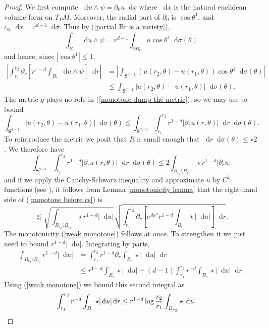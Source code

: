 \documentclass[reqno,10pt]{amsart}
\newcommand{\Sph}{\mathbf S}
\newcommand*\dif{\mathop{}\!\mathrm{d}}
\theoremstyle{definition}
\numberwithin{equation}{section}
\begin{document}
\begin{proof}
We first compute $\dif u \wedge \psi = \partial_0 u \dif x$
where $\dif x$ is the natural euclidean volume form on $T_PM$.
Moreover, the radial part of $\partial_0$ is $\cos \theta^1$, and $\iota_{\partial_r} \dif x = r^{d - 1} \dif \sigma$.
Thus by (\ref{partial Br is a variety}),
$$\int_{B_r} \dif u \wedge \psi = r^{d - 1}\int_{\partial B_r} u \cos \theta^1 \dif \sigma(\theta)$$
and hence, since $|\cos \theta^1| \leq 1$,
\begin{align}
\left|\int_{r_1}^{r_2} \partial_r \left[r^{1 - d}\int_{B_r} \dif u \wedge \psi\right] \dif r\right|
&= \left|\int_{\Sph^{d - 1}} (u(r_2, \theta) - u(r_1, \theta)) \cos \theta^1 \dif \sigma(\theta)\right| \\
&\leq \int_{\Sph^{d - 1}} |u(r_2, \theta) - u(r_1, \theta)| \dif \sigma(\theta). \label{monotone dump the metric}
\end{align}
The metric $g$ plays no role in (\ref{monotone dump the metric}), so we may use \cite[Lemma 5.3]{Giusti77} to bound
$$\int_{\Sph^{d - 1}} |u(r_2, \theta) - u(r_1, \theta)| \dif \sigma(\theta) \leq \int_{\Sph^{d - 1}} \int_{r_1}^{r_2} r^{1 - d}|\partial_r u(r, \theta)| \dif r \dif\sigma(\theta).$$
To reintroduce the metric we posit that $R$ is small enough that $\dif r \dif \sigma(\theta) \leq \star 2$.
We therefore have
\begin{equation}\label{monotone before cs}
\int_{\Sph^{d - 1}} \int_{r_1}^{r_2} r^{1 - d}|\partial_r u(r, \theta)| \dif r \dif\sigma(\theta) \leq 2 \int_{B_{r_2} \setminus B_{r_1}} \star r^{1 - d}|\partial_r u|
\end{equation}
and if we apply the Cauchy-Schwarz inequality and approximate $u$ by $C^1$ functions (see \cite[pg68]{Giusti77}), it follows from Lemma \ref{monotonicity lemma} that the right-hand side of (\ref{monotone before cs}) is
$$\lesssim \sqrt{\int_{B_{r_2} \setminus B_{r_1}} \star r^{1 - d} |\dif u|} \sqrt{\int_{r_1}^{r_2} \partial_r \left[e^{Ar^2} r^{1-d}\int_{B_r} \star |\dif u|\right] \dif r}.$$
The monotonicity (\ref{weak monotone}) follows at once. To strengthen it we just need to bound $r^{1 - d} |\dif u|$.
Integrating by parts,
\begin{align*}
\int_{B_{r_2} \setminus B_{r_1}} r^{1 - d} |\dif u| &= \int_{r_1}^{r_2} r^{1 - d} \partial_r \int_{B_r} \star |\dif u| \dif r \\
&\leq r^{1 - d} \int_{B_r} \star |\dif u| + (d - 1) \int_{r_1}^{r_2} r^{-d} \int_{B_r} \star |\dif u| \dif r.
\end{align*}
Using (\ref{weak monotone}) we bound this second integral as
\begin{align*}
\int_{r_1}^{r_2} r^{-d} \int_{B_r} \star |\dif u| \dif r &\leq r^{1 - d} \log \frac{r_2}{r_1} \int_{B_{r_2}} \star |\dif u|. \qedhere
\end{align*}
\end{proof}
\end{document}
